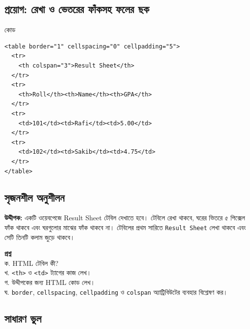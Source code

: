 
\subsection{প্রয়োগ: রেখা ও ভেতরের ফাঁকসহ ফলের ছক}


\begin{chFourWholeExample}{কোড}
\begin{verbatim}
<table border="1" cellspacing="0" cellpadding="5">
  <tr>
    <th colspan="3">Result Sheet</th>
  </tr>
  <tr>
    <th>Roll</th><th>Name</th><th>GPA</th>
  </tr>
  <tr>
    <td>101</td><td>Rafi</td><td>5.00</td>
  </tr>
  <tr>
    <td>102</td><td>Sakib</td><td>4.75</td>
  </tr>
</table>
\end{verbatim}
\end{chFourWholeExample}


\subsection{সৃজনশীল অনুশীলন}

\begin{practicebox}
\textbf{উদ্দীপক:} একটি ওয়েবপেজে Result Sheet টেবিল দেখাতে হবে। টেবিলে রেখা থাকবে, ঘরের ভিতরে ৫ পিক্সেল ফাঁক থাকবে এবং ঘরগুলোর মাঝের ফাঁক থাকবে না। টেবিলের প্রথম সারিতে \texttt{Result Sheet} লেখা থাকবে এবং সেটি তিনটি কলাম জুড়ে থাকবে।

\textbf{প্রশ্ন}\\
ক. HTML টেবিল কী?\\
খ. \texttt{<th>} ও \texttt{<td>} ট্যাগের কাজ লেখ।\\
গ. উদ্দীপকের জন্য HTML কোড লেখ।\\
ঘ. \texttt{border}, \texttt{cellspacing}, \texttt{cellpadding} ও \texttt{colspan} অ্যাট্রিবিউটের ব্যবহার বিশ্লেষণ কর।
\end{practicebox}

\subsection{সাধারণ ভুল}


